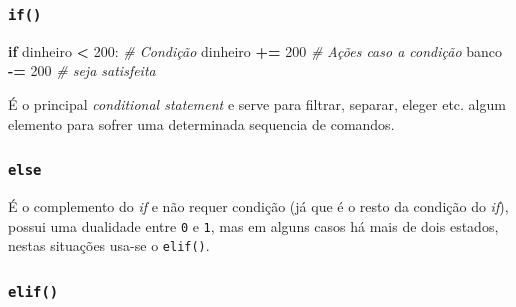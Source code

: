 \documentclass[]{book}
\newenvironment{Shaded}{\begin{snugshade}}{\end{snugshade}}
\newcommand{\DecValTok}[1]{\textcolor[rgb]{0.00,0.00,0.81}{#1}}
\newcommand{\StringTok}[1]{\textcolor[rgb]{0.31,0.60,0.02}{#1}}
\newcommand{\CommentTok}[1]{\textcolor[rgb]{0.56,0.35,0.01}{\textit{#1}}}
\newcommand{\ControlFlowTok}[1]{\textcolor[rgb]{0.13,0.29,0.53}{\textbf{#1}}}
\newcommand{\OperatorTok}[1]{\textcolor[rgb]{0.81,0.36,0.00}{\textbf{#1}}}
\newcommand{\BuiltInTok}[1]{#1}
\newcommand{\NormalTok}[1]{#1}
\begin{document}
\subsubsection{\texorpdfstring{\texttt{if()}}{if()}}\label{if}

\begin{Shaded}
\begin{Highlighting}[]
\ControlFlowTok{if}\NormalTok{ dinheiro }\OperatorTok{<} \DecValTok{200}\NormalTok{:      }\CommentTok{# Condição}
\NormalTok{    dinheiro }\OperatorTok{+=} \DecValTok{200}     \CommentTok{# Ações caso a condição}
\NormalTok{    banco }\OperatorTok{-=} \DecValTok{200}        \CommentTok{# seja satisfeita}
\end{Highlighting}
\end{Shaded}

É o principal \emph{conditional statement} e serve para filtrar,
separar, eleger etc. algum elemento para sofrer uma determinada
sequencia de comandos.

\subsubsection{\texorpdfstring{\texttt{else}}{else}}\label{else}

\begin{Shaded}
\end{Shaded}

É o complemento do \emph{if} e não requer condição (já que é o resto da
condição do \emph{if}), possui uma dualidade entre \texttt{0} e
\texttt{1}, mas em alguns casos há mais de dois estados, nestas
situações usa-se o \texttt{elif()}.

\subsubsection{\texorpdfstring{\texttt{elif()}}{elif()}}\label{elif}
\end{document}
